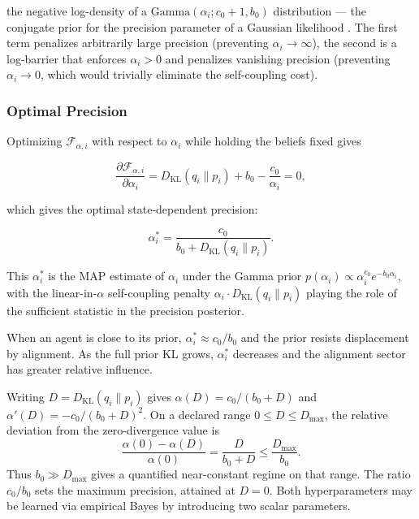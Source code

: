 \documentclass[twoside,11pt]{article}
\begin{document}
the negative log-density of a $\mathrm{Gamma}(\alpha_i; c_0 + 1, b_0)$ distribution — the conjugate prior for the precision parameter of a Gaussian likelihood \citep{Bishop2006, murphy2012machine}. The first term penalizes arbitrarily large precision (preventing $\alpha_i \to \infty$), the second is a log-barrier that enforces $\alpha_i > 0$ and penalizes vanishing precision (preventing $\alpha_i \to 0$, which would trivially eliminate the self-coupling cost). 

\subsubsection{Optimal Precision}

Optimizing $\mathcal{F}_{\alpha,i}$ with respect to $\alpha_i$ while holding the beliefs fixed gives

\begin{equation}
\frac{\partial \mathcal{F}_{\alpha,i}}{\partial \alpha_i}
= D_{\mathrm{KL}}(q_i \| p_i) + b_0 - \frac{c_0}{\alpha_i} = 0,
\end{equation}

which gives the optimal state-dependent precision:

\begin{equation}
\boxed{
\alpha_i^*
 = \frac{c_0}{b_0 + D_{\mathrm{KL}}(q_i \| p_i)}.
}
\label{eq:state_dependent_alpha}
\end{equation}

This $\alpha_i^*$ is the MAP estimate of $\alpha_i$ under the Gamma prior $p(\alpha_i) \propto \alpha_i^{c_0} e^{-b_0 \alpha_i}$, with the linear-in-$\alpha$ self-coupling penalty $\alpha_i \cdot D_{\mathrm{KL}}(q_i \| p_i)$ playing the role of the sufficient statistic in the precision posterior.

When an agent is close to its prior, $\alpha_i^*\approx c_0/b_0$ and the prior resists displacement by alignment. As the full prior KL grows, $\alpha_i^*$ decreases and the alignment sector has greater relative influence.

Writing $D=D_{\mathrm{KL}}(q_i\|p_i)$ gives $\alpha(D)=c_0/(b_0+D)$ and $\alpha'(D)=-c_0/(b_0+D)^2$. On a declared range $0\leq D\leq D_{\max}$, the relative deviation from the zero-divergence value is
\begin{equation}
\frac{\alpha(0)-\alpha(D)}{\alpha(0)}
=\frac{D}{b_0+D}
\leq\frac{D_{\max}}{b_0}.
\end{equation}
Thus $b_0\gg D_{\max}$ gives a quantified near-constant regime on that range. The ratio $c_0/b_0$ sets the maximum precision, attained at $D=0$. Both hyperparameters may be learned via empirical Bayes by introducing two scalar parameters.
\end{document}
